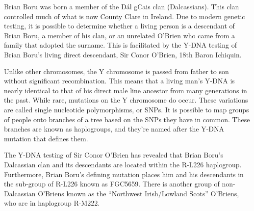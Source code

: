 Brian Boru was born a member of the D\'{a}l gCais clan (Dalcassians). This clan controlled much of what is now County Clare in Ireland.\cite{BoruEarlyHistory} Due to modern genetic testing, it is possible to determine whether a living person is a descendant of Brian Boru, a member of his clan, or an unrelated O'Brien who came from a family that adopted the surname. This is facilitated by the Y-DNA testing of Brian Boru's living direct descendant, Sir Conor O'Brien, 18th Baron Ichiquin.\cite{GGI:1}

Unlike other chromosomes, the Y chromosome is passed from father to son without significant recombination. This means that a living man's Y-DNA is nearly identical to that of his direct male line ancestor from many generations in the past. While rare, mutations on the Y chromosome do occur. These variations are called single nucleotide polymorphisms, or SNPs. It is possible to map groups of people onto branches of a tree based on the SNPs they have in common. These branches are known as haplogroups, and they're named after the Y-DNA mutation that defines them.\cite{Bettinger}

The Y-DNA testing of Sir Conor O'Brien has revealed that Brian Boru's Dalcassian clan and its descendants are located within the R-L226 haplogroup. Furthermore, Brian Boru's defining mutation places him and his descendants in the sub-group of R-L226 known as FGC5659. There is another group of non-Dalcassian O'Briens known as the ``Northwest Irish/Lowland Scots'' O'Briens, who are in haplogroup R-M222.\cite{GGI:2}


